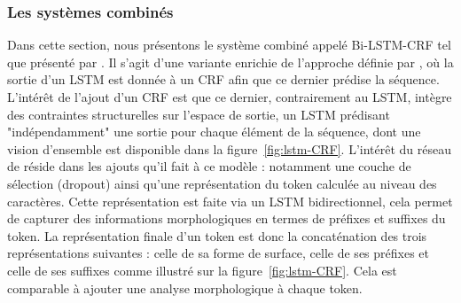 \documentclass[12pt,a4paper,times,twoside,openright]{report}
\begin{document}
            \subsubsection{Les systèmes combinés}
            \label{subsubsec:NN-combinations}
Dans cette section, nous présentons le système combiné appelé Bi-LSTM-CRF tel que présenté par \citet{lample2016neural}. Il s'agit d'une variante enrichie de l'approche définie par \citet{huang2015bidirectional}, où la sortie d'un LSTM est donnée à un CRF afin que ce dernier prédise la séquence. L'intérêt de l'ajout d'un CRF est que ce dernier, contrairement au LSTM, intègre des contraintes structurelles sur l'espace de sortie, un LSTM prédisant "indépendamment" une sortie pour chaque élément de la séquence, dont une vision d'ensemble est disponible dans la figure\ \ref{fig:lstm-CRF}. L'intérêt du réseau de \citet{lample2016neural} réside dans les ajouts qu'il fait à ce modèle : notamment une couche de sélection (dropout) ainsi qu'une représentation du token calculée au niveau des caractères. Cette représentation est faite via un LSTM bidirectionnel, cela permet de capturer des informations morphologiques en termes de préfixes et suffixes du token. La représentation finale d'un token est donc la concaténation des trois représentations suivantes : celle de sa forme de surface, celle de ses préfixes et celle de ses suffixes comme illustré sur la figure\ \ref{fig:lstm-CRF}. Cela est comparable à ajouter une analyse morphologique à chaque token.
\end{document}
